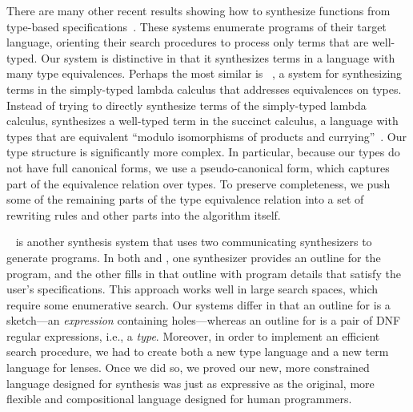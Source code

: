 \documentclass[sigplan,acmsmall]{acmart}
\begin{document}
There are many other recent results showing how to synthesize functions from
type-based
specifications~\cite{augustsson-2004,osera+:pldi15,feser-pldi-2015,scherer-icfp-2015,frankle+:popl16,armando+:pldi16}.
These systems enumerate programs of their target language, orienting their
search procedures to process only terms that are well-typed.
Our system is distinctive in that it synthesizes terms in a language with many
type equivalences. 
Perhaps the most similar is \InSynth{}~\cite{gvero-pldi-2013}, a system for
synthesizing terms in the simply-typed lambda calculus that addresses
equivalences on types.  Instead of trying to directly synthesize terms of the
simply-typed lambda calculus, \InSynth{} synthesizes a well-typed term
in the succinct calculus, a language with types
that are equivalent ``modulo isomorphisms of products and
currying''~\cite{gvero-pldi-2013}.
Our type structure is significantly more complex.  In particular, because our 
types do not have full canonical forms, we
use a pseudo-canonical form, which captures part of the equivalence
relation over types.  To preserve completeness, we push some of the remaining
parts of the type equivalence relation into a set of rewriting rules and
other parts into
the \RigidSynth{} algorithm itself.

\Morpheus{}~\cite{morpheus} is another synthesis system that uses two
communicating synthesizers to generate programs.  In both \Morpheus{} and
\Optician{}, one synthesizer provides an 
outline for the program, and the other fills in that outline with program
details that satisfy the user's specifications.
This approach works well in large search spaces, which
require some enumerative search.
Our systems differ in that an outline for \Morpheus{} is a sketch---an 
\emph{expression}
containing holes---whereas
an outline for \Optician{} is a pair of DNF regular
expressions, i.e., a 
\emph{type}.  Moreover, in order to implement an efficient
search procedure, we had to create both a new type language and a new
term language for lenses.  Once we did so, we proved our new, more
constrained language
designed for synthesis was just as expressive as the original, more
flexible and compositional language designed for human programmers.
\end{document}
